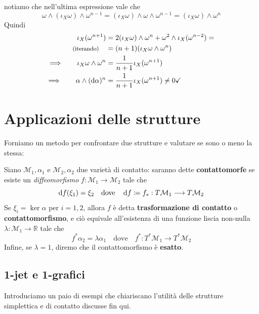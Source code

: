 notiamo che nell'ultima espressione vale che
\[
    \omega \wedge (\iota_X \omega) \wedge \omega^{n-1} = (\iota_X \omega) \wedge \omega \wedge \omega^{n-1} = (\iota_X \omega) \wedge \omega^n
\]
Quindi
\begin{align*}
    \iota_X (\omega^{n+1})                                 & = 2(\iota_X \omega) \wedge \omega^n + \omega^2 \wedge \iota_X (\omega^{n-2}) = \\
    \text{\footnotesize{(iterando)}} \quad                 & = (n + 1) (\iota_X \omega \wedge \omega^n)                                     \\
    \Longrightarrow \qquad \iota_X \omega \wedge \omega^n  & = \frac{1}{n+1} \iota_X (\omega^{n+1})                                         \\
    \Longrightarrow \qquad \alpha \wedge (\odif{\alpha})^n & = \frac{1}{n+1} \iota_X (\omega^{n+1}) \neq 0 \checkmark                       \\
\end{align*}

\section{Applicazioni delle strutture}

Forniamo un metodo per confrontare due strutture e valutare se sono o meno la stessa:
\begin{definition}
    \cite{geiges_contact} Siano $\mathcal{M}_1, \alpha_1$ e $\mathcal{M}_2, \alpha_2$ due varietà di contatto: saranno dette \textbf{contattomorfe} se esiste un \emph{diffeomorfismo} $f : \mathcal{M}_1 \longrightarrow \mathcal{M}_2 $ tale che
    \[
        \odif{f}(\xi_1) = \xi_2 \quad \text{dove} \quad \odif{f} \coloneqq f_* : T\mathcal{M}_1 \longrightarrow T\mathcal{M}_2
    \]
    Se $ \xi_i = \ker \alpha $ per $ i = 1, 2 $, allora $f$ è detta \textbf{trasformazione di contatto} o \textbf{contattomorfismo}, e ciò equivale all'esistenza di una funzione liscia non-nulla $\lambda : \mathcal{M}_1 \longrightarrow \mathbb{R}$ tale che
    \[
        f^* \alpha_2 = \lambda \alpha_1 \quad \text{dove} \quad f^* : T^*\mathcal{M}_1 \longrightarrow T^*\mathcal{M}_2
    \]
    Infine, se $\lambda = 1$, diremo che il contattomorfismo è \textbf{esatto}.
\end{definition}

\subsection{1-jet e 1-grafici}
Introduciamo un paio di esempi che chiariscano l'utilità delle strutture simplettica e di contatto discusse fin qui.


